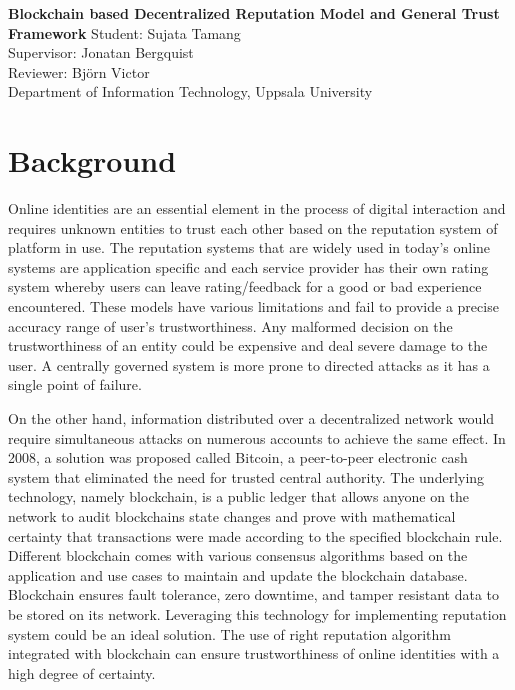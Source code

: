 \documentclass[a4paper,11pt,dvipsnames]{article}
\begin{document}
	\begin{center}
		\textbf{\huge{Blockchain based Decentralized Reputation Model and 
		General Trust Framework}}
		\newline
		\textsf{\large{Student: Sujata Tamang}}\\
		\textsf{\large{Supervisor: Jonatan Bergquist }}\\
		\textsf{\large{Reviewer: Björn Victor}}\\
		\textsf{\large{Department of Information Technology, Uppsala University}}
	\end{center}
	
	\section*{Background}
	Online identities are an essential element in the process of digital 
	interaction and requires unknown entities to trust each other based on 
	the reputation system of platform in use. The reputation systems that are 
	widely used in today's online systems are application specific and each 
	service provider has their own rating system whereby users can leave 
	rating/feedback for a good or bad experience encountered.
	These models have various limitations and fail to provide a precise 
	accuracy range of user's trustworthiness.
	\cite{Josang:2007:STR:1225318.1225716} Any malformed decision on the 
	trustworthiness of an entity could be expensive and deal severe damage to 
	the user. A centrally governed system is more prone to directed attacks as 
	it has a single point of failure. 
	
	On the other hand, information distributed over a decentralized network would	require simultaneous attacks on numerous accounts to achieve the same effect.
	In 2008, a solution was proposed called Bitcoin, a peer-to-peer electronic 
	cash system \cite{Bitcoin_Satoshi} that eliminated the need for trusted 
	central authority. The underlying technology, namely blockchain, is a 
	public ledger that allows anyone on the network to audit blockchains state 
	changes and prove with mathematical certainty that transactions were made 
	according to the specified blockchain rule. \cite{enoughBitcoinForEthereum} 
	Different blockchain comes with various consensus algorithms based on the 
	application and use cases to maintain and update the blockchain database. 
	Blockchain ensures fault tolerance, zero downtime, and tamper resistant 
	data to be stored on its network. Leveraging this technology for 
	implementing reputation system could be an ideal solution. The use of 
	right reputation algorithm integrated with blockchain can ensure 
	trustworthiness of online identities with a high degree of certainty. 
\end{document}
